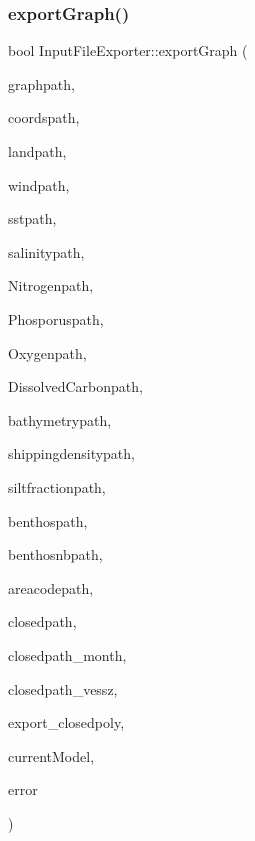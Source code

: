 \subsubsection{\texorpdfstring{exportGraph()}{exportGraph()}}
{\footnotesize\ttfamily bool Input\+File\+Exporter\+::export\+Graph (\begin{DoxyParamCaption}\item[{Q\+String}]{graphpath,  }\item[{Q\+String}]{coordspath,  }\item[{Q\+String}]{landpath,  }\item[{Q\+String}]{windpath,  }\item[{Q\+String}]{sstpath,  }\item[{Q\+String}]{salinitypath,  }\item[{Q\+String}]{Nitrogenpath,  }\item[{Q\+String}]{Phosporuspath,  }\item[{Q\+String}]{Oxygenpath,  }\item[{Q\+String}]{Dissolved\+Carbonpath,  }\item[{Q\+String}]{bathymetrypath,  }\item[{Q\+String}]{shippingdensitypath,  }\item[{Q\+String}]{siltfractionpath,  }\item[{Q\+String}]{benthospath,  }\item[{Q\+String}]{benthosnbpath,  }\item[{Q\+String}]{areacodepath,  }\item[{Q\+String}]{closedpath,  }\item[{Q\+String}]{closedpath\+\_\+month,  }\item[{Q\+String}]{closedpath\+\_\+vessz,  }\item[{bool}]{export\+\_\+closedpoly,  }\item[{\mbox{\hyperlink{class_displace_model}{Displace\+Model}} $\ast$}]{current\+Model,  }\item[{Q\+String $\ast$}]{error }\end{DoxyParamCaption})}

\mbox{\label{class_input_file_exporter_a8d880853625219459c63fd5da193fa52}} 
